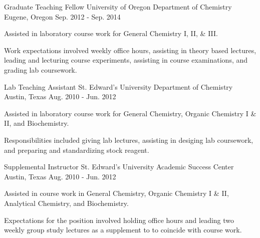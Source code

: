 \begin{cventries}
  \cventry
    {Graduate Teaching Fellow}
    {University of Oregon Department of Chemistry}
    {Eugene, Oregon}
    {Sep. 2012 - Sep. 2014}
    {
      \begin{cvitems}
        \item{Assisted in laboratory course work for General Chemistry I, II, \& III.}
        \item{Work expectations involved weekly office hours, assisting in theory based lectures, leading and lecturing course experiments, assisting in course examinations, and grading lab coursework.}
      \end{cvitems}
    }

  \cventry
    {Lab Teaching Assistant}
    {St. Edward's University Department of Chemistry}
    {Austin, Texas}
    {Aug. 2010 - Jun. 2012}
    {
      \begin{cvitems}
        \item{Assisted in laboratory course work for General Chemistry, Organic Chemistry I \& II, and Biochemistry.}
        \item{Responsibilities included giving lab lectures, assisting in desiging lab coursework, and preparing and standardizing stock reagent.}
      \end{cvitems}
    }

  \cventry
    {Supplemental Instructor}
    {St. Edward's University Academic Success Center}
    {Austin, Texas}
    {Aug. 2010 - Jun. 2012}
    {
      \begin{cvitems}
        \item{Assisted in course work in General Chemistry, Organic Chemistry I \& II, Analytical Chemistry, and Biochemistry.}
        \item{Expectations for the position involved holding office hours and leading two weekly group study lectures as a supplement to to coincide with course work.}
      \end{cvitems}
    }
\end{cventries}
